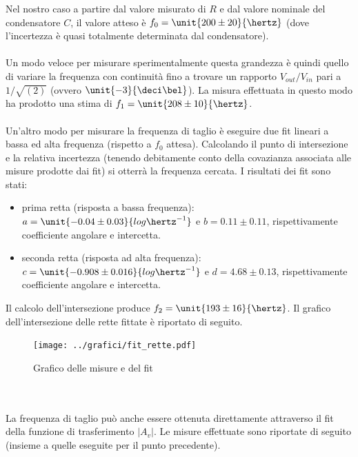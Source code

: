 \documentclass[10pt,a4paper]{article}
\begin{document}
Nel nostro caso a partire dal valore misurato di $R$ e dal valore nominale del condensatore $C$, il valore atteso è $f_0 = \unit{200 \pm 20}{\hertz}$ (dove l'incertezza è quasi totalmente determinata dal condensatore).
\\\\
Un modo veloce per misurare sperimentalmente questa grandezza è quindi quello di variare la frequenza con continuità fino a trovare  un rapporto $V_{out}/V_{in}$ pari a $1/\sqrt{(2)}$ (ovvero $\unit{-3}{\deci\bel}$). La misura effettuata in questo modo ha prodotto una stima di $f_1 =\unit{208 \pm 10}{\hertz}$.
\\\\
Un'altro modo per misurare la frequenza di taglio è eseguire due fit lineari a bassa ed alta frequenza (rispetto a $f_0$ attesa). Calcolando il punto di intersezione e la relativa incertezza (tenendo debitamente conto della covazianza associata alle misure prodotte dai fit) si otterrà la frequenza cercata. I risultati dei fit sono stati: 
\begin{itemize}
	\item prima retta (risposta a bassa frequenza):	 $a=\unit{-0.04 \pm 0.03}{log{\hertz^{-1}}}$ e	 $b=0.11 \pm 0.11$, rispettivamente coefficiente angolare e intercetta.
	\item seconda retta (risposta ad alta frequenza):	 $c=\unit{-0.908 \pm 0.016}{log{\hertz^{-1}}}$ e	 $d=4.68\pm 0.13$, rispettivamente coefficiente angolare e intercetta.
\end{itemize}
Il calcolo dell'intersezione produce $f_2 =\unit{ 193 \pm 16}{\hertz}$.
Il grafico dell'intersezione delle rette fittate è riportato di seguito.
\begin{figure}[h]
	\centering
	\texttt{[image: ../grafici/fit\_rette.pdf]}
	\caption{Grafico delle misure e del fit}
\end{figure}
\\\\
La frequenza di taglio può anche essere ottenuta direttamente attraverso il fit della funzione di trasferimento $|A_v|$. Le misure effettuate sono riportate di seguito (insieme a quelle eseguite per il punto precedente).
\end{document}
